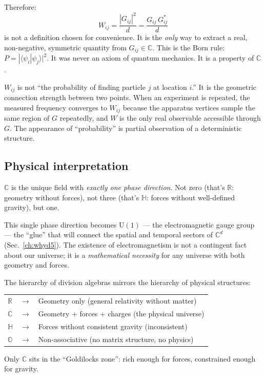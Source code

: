 Therefore:
\begin{equation}
W_{ij} = \frac{|G_{ij}|^2}{d} = \frac{G_{ij}\,G^*_{ij}}{d}
\end{equation}
is not a definition chosen for convenience. It is the \emph{only} way to extract a real, non-negative, symmetric quantity from $G_{ij} \in \mathbb{C}$. This is the Born rule: $P = |\langle\psi_i|\psi_j\rangle|^2$. It was never an axiom of quantum mechanics. It is a property of $\mathbb{C}$.

\begin{remark}
$W_{ij}$ is not ``the probability of finding particle $j$ at location $i$.'' It is the geometric connection strength between two points. When an experiment is repeated, the measured frequency converges to $W_{ij}$ because the apparatus vertices sample the same region of $G$ repeatedly, and $W$ is the only real observable accessible through $G$. The appearance of ``probability'' is partial observation of a deterministic structure.
\end{remark}

\subsection{Physical interpretation}

$\mathbb{C}$ is the unique field with \emph{exactly one phase direction}. Not zero (that's $\mathbb{R}$: geometry without forces), not three (that's $\mathbb{H}$: forces without well-defined gravity), but one.

This single phase direction becomes $\text{U}(1)$ --- the electromagnetic gauge group --- the ``glue'' that will connect the spatial and temporal sectors of $\mathbb{C}^d$ (Sec.~\ref{ch:whyd5}). The existence of electromagnetism is not a contingent fact about our universe; it is a \emph{mathematical necessity} for any universe with both geometry and forces.

\begin{remark}
The hierarchy of division algebras mirrors the hierarchy of physical structures:
\begin{center}
\begin{tabular}{lcl}
$\mathbb{R}$ & $\to$ & Geometry only (general relativity without matter) \\
$\mathbb{C}$ & $\to$ & Geometry + forces + charges (the physical universe) \\
$\mathbb{H}$ & $\to$ & Forces without consistent gravity (inconsistent) \\
$\mathbb{O}$ & $\to$ & Non-associative (no matrix structure, no physics)
\end{tabular}
\end{center}
Only $\mathbb{C}$ sits in the ``Goldilocks zone'': rich enough for forces, constrained enough for gravity.
\end{remark}

